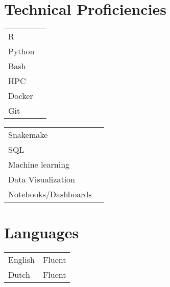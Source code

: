 \documentclass[a4paper,10pt]{article}
\begin{document}
\noindent
\begin{minipage}[t]{0.6\textwidth}
  \section*{Technical Proficiencies}
\begin{multicols}{2}
\begin{tabular}{ll}
      R       & \SkillBull{$\bullet\bullet\bullet\bullet\bullet$} \\
      Python  & \SkillBull{$\bullet\bullet\bullet\bullet\circ$} \\
      Bash    & \SkillBull{$\bullet\bullet\bullet\bullet\bullet$} \\
      HPC    & \SkillBull{$\bullet\bullet\bullet\bullet\bullet$} \\
      Docker    & \SkillBull{$\bullet\bullet\bullet\circ\circ$} \\
      Git    & \SkillBull{$\bullet\bullet\bullet\bullet\circ$} \\
\end{tabular}

\vfill\null \columnbreak

    \begin{tabular}{ll}
      Snakemake    & \SkillBull{$\bullet\bullet\bullet\bullet\bullet$} \\
      SQL    & \SkillBull{$\bullet\bullet\circ\circ\circ$} \\
      Machine learning    & \SkillBull{$\bullet\bullet\bullet\bullet\circ$} \\
      Data Visualization    & \SkillBull{$\bullet\bullet\bullet\bullet\bullet$} \\
      Notebooks/Dashboards    & \SkillBull{$\bullet\bullet\bullet\bullet\bullet$} \\
    \end{tabular}
  \end{multicols}
\end{minipage}
\hfill
\noindent
\begin{minipage}[t]{.3\textwidth}
\section*{Languages}
\begin{tabular}{ll}
  English & Fluent \\
  Dutch   & Fluent \\
\end{tabular}
\end{minipage}

\LastUpdate
\end{document}
